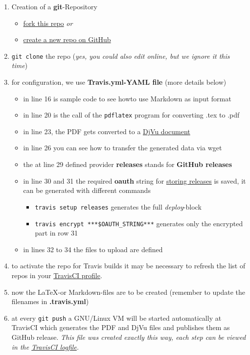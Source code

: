 \documentclass[10pt,letterpaper]{article}
\providecommand{\tightlist}{
  \setlength{\itemsep}{0pt}\setlength{\parskip}{0pt}}
\begin{document}
\begin{enumerate}
\def\labelenumi{\arabic{enumi}.}
\tightlist
\item
  Creation of a \textbf{git}-Repository

\begin{itemize}
\tightlist
\item
  \href{https://github.com/SimonWaldherr/golang-examples\#fork-destination-box}{fork
  this repo} \emph{or}
\item
  \href{https://github.com/new}{create a new repo on GitHub}
\end{itemize}

\item
  \texttt{git\ clone} the repo (\emph{yes, you could also edit online,
  but we ignore it this time})
\item
  for configuration, we use \textbf{Travis.yml-YAML file} (more details
  below)

\begin{itemize}
\tightlist
\item
  in line 16 is sample code to see howto use Markdown as input format
\item
  in line 20 is the call of the \texttt{pdflatex} program for converting
  .tex to .pdf
\item
  in line 23, the PDF gets converted to a
  \href{https://de.wikipedia.org/wiki/DjVu}{DjVu document}
\item
  in line 26 you can see how to transfer the generated data via wget
\item
  the at line 29 defined provider \textbf{releases} stands for
  \textbf{GitHub releases}
\item
  in line 30 and 31 the required \textbf{oauth} string for
  \href{http://docs.travis-ci.com/user/deployment/releases/}{storing
  releases} is saved, it can be generated with different commands

  \begin{itemize}
  \tightlist
  \item
    \texttt{travis\ setup\ releases} generates the full
    \emph{deploy}-block
  \item
    \texttt{travis\ encrypt\ ***\$OAUTH\_STRING***} generates only the
    encrypted part in row 31
  \end{itemize}
\item
  in lines 32 to 34 the files to upload are defined
\end{itemize}

\item
  to activate the repo for Travis builds it may be necessary to refresh
  the list of repos in your
  \href{https://travis-ci.org/profile}{TravisCI profile}.
\item
  now the \LaTeX -or Markdown-files are to be created (remember to update
  the filenames in \textbf{.travis.yml})
\item
  at every \texttt{git\ push} a GNU/Linux VM will be started
  automatically at TravisCI which generates the PDF and DjVu files and
  publishes them as GitHub release. \emph{This file was created exactly
  this way, each step can be viewed in the
  \href{https://travis-ci.org/SimonWaldherr/testrepo}{TravisCI
  logfile}.}
\end{enumerate}
\end{document}
